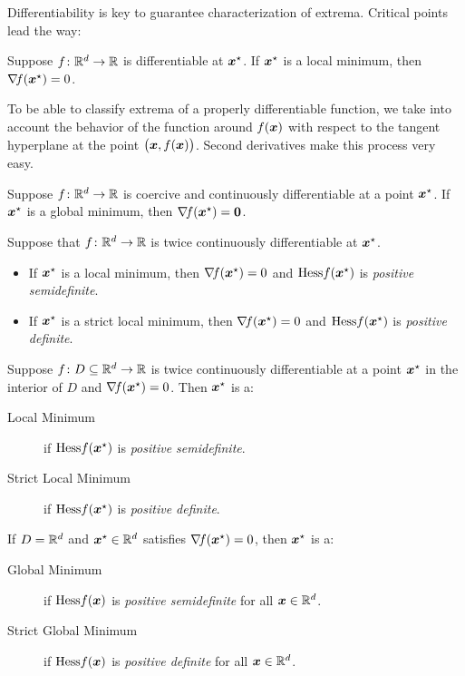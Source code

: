 Differentiability is key to guarantee characterization of extrema.  Critical points lead the way:

\begin{theorem}\label{theorem:criticalGivesMinima}
Suppose $f\colon \mathbb{R}^d \to \mathbb{R}$ is differentiable at $\boldsymbol{x}^{\star}$.  If $\boldsymbol{x}^{\star}$ is a local minimum, then $\mathop{\nabla\! {f}}(\boldsymbol{x}^{\star})=0$.
\end{theorem}

To be able to classify extrema of a properly differentiable function, we take into account the behavior of the function around $f(\boldsymbol{x})$ with respect to the tangent hyperplane at the point $\big(\boldsymbol{x}, f(\boldsymbol{x})\big)$.  Second derivatives make this process very easy.

\begin{theorem}\label{theorem:coerciveMinima}
Suppose $f \colon \mathbb{R}^d \to \mathbb{R}$ is coercive and continuously differentiable at a point $\boldsymbol{x}^{\star}$.  If $\boldsymbol{x}^{\star}$ is a global minimum, then $\mathop{\nabla\! {f}}(\boldsymbol{x}^{\star})= \boldsymbol{0}$.
\end{theorem}

\begin{theorem}\label{theorem:necessaryMinima}
Suppose that $f\colon \mathbb{R}^d \to \mathbb{R}$ is twice continuously differentiable at $\boldsymbol{x}^{\star}$.  
\begin{itemize}
\item If $\boldsymbol{x}^{\star}$ is a local minimum, then $\mathop{\nabla\! {f}}(\boldsymbol{x}^{\star})=0$ and $\mathop{\mathrm{Hess}{f}}(\boldsymbol{x}^{\star})$ is \emph{positive semidefinite}.
\item If $\boldsymbol{x}^{\star}$ is a strict local minimum, then $\mathop{\nabla\! {f}}(\boldsymbol{x}^{\star})=0$ and $\mathop{\mathrm{Hess}{f}}(\boldsymbol{x}^{\star})$ is \emph{positive definite}.
\end{itemize}
\end{theorem}

\begin{theorem}\label{theorem:sufficientMinima}
Suppose $f\colon D \subseteq \mathbb{R}^d \to \mathbb{R}$ is twice continuously differentiable at a point $\boldsymbol{x}^{\star}$ in the interior of $D$ and $\mathop{\nabla\! {f}}(\boldsymbol{x}^{\star})=0$.  Then $\boldsymbol{x}^{\star}$ is a:
\begin{description}
	\item[Local Minimum] if $\mathop{\mathrm{Hess}{f}}(\boldsymbol{x}^{\star})$ is \emph{positive semidefinite}.
	\item[Strict Local Minimum] if $\mathop{\mathrm{Hess}{f}}(\boldsymbol{x}^{\star})$ is \emph{positive definite}.
\end{description}
If $D=\mathbb{R}^d$ and $\boldsymbol{x}^{\star} \in \mathbb{R}^d$ satisfies $\mathop{\nabla\! {f}}(\boldsymbol{x}^{\star})=0$, then $\boldsymbol{x}^{\star}$ is a:
\begin{description}
	\item[Global Minimum] if $\mathop{\mathrm{Hess}{f}}(\boldsymbol{x})$ is \emph{positive semidefinite} for all $\boldsymbol{x} \in \mathbb{R}^d$.
	\item[Strict Global Minimum] if $\mathop{\mathrm{Hess}{f}}(\boldsymbol{x})$ is \emph{positive definite} for all $\boldsymbol{x} \in \mathbb{R}^d$.
\end{description}
\end{theorem}

